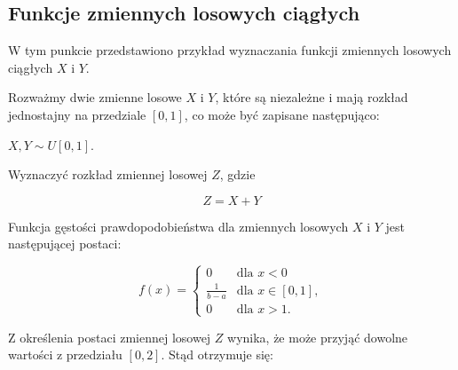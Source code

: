 \documentclass[
  letterpaper,
  DIV=11,
  numbers=noendperiod]{scrreprt}
\begin{document}
\subsection{Funkcje zmiennych losowych
ciągłych}\label{funkcje-zmiennych-losowych-ciux105gux142ych}

W tym punkcie przedstawiono przykład wyznaczania funkcji zmiennych
losowych ciągłych \(X\) i \(Y\).

\begin{tcolorbox}[enhanced jigsaw, toprule=.15mm, title=\textcolor{quarto-callout-tip-color}{\faLightbulb}\hspace{0.5em}{Przykład 8.2}, breakable, coltitle=black, titlerule=0mm, colbacktitle=quarto-callout-tip-color!10!white, opacitybacktitle=0.6, opacityback=0, bottomtitle=1mm, left=2mm, arc=.35mm, leftrule=.75mm, bottomrule=.15mm, rightrule=.15mm, toptitle=1mm, colframe=quarto-callout-tip-color-frame, colback=white]

\end{tcolorbox}

Rozważmy dwie zmienne losowe \(X\) i \(Y\), które są niezależne i mają
rozkład jednostajny na przedziale \([0, 1]\), co może być zapisane
następująco:

\(X, Y  \sim  U[0, 1]\).

Wyznaczyć rozkład zmiennej losowej \(Z\), gdzie

\[Z = X + Y\]

\begin{tcolorbox}[enhanced jigsaw, toprule=.15mm, title={Rozwiązanie}, breakable, coltitle=black, titlerule=0mm, colbacktitle=quarto-callout-tip-color!10!white, opacitybacktitle=0.6, opacityback=0, bottomtitle=1mm, left=2mm, arc=.35mm, leftrule=.75mm, bottomrule=.15mm, rightrule=.15mm, toptitle=1mm, colframe=quarto-callout-tip-color-frame, colback=white]

\end{tcolorbox}

Funkcja gęstości prawdopodobieństwa dla zmiennych losowych \(X\) i \(Y\)
jest następującej postaci:

\[
f(x) = 
\begin{cases} 
0 &  \text{dla }x <0 \\
\frac{1}{b - a} & \text{dla } x \in [0, 1], \\
0 &  \text{dla }x >1.
\end{cases} 
\]

Z określenia postaci zmiennej losowej \(Z\) wynika, że może przyjąć
dowolne wartości z przedziału \([0, 2].\) Stąd otrzymuje się:
\end{document}
